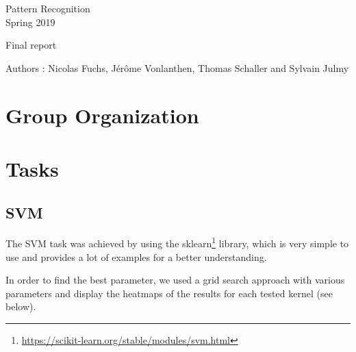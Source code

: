 \documentclass[a4paper,11pt]{report}
\date{\today}
\begin{document}
\begin{center}
  \large{
    Pattern Recognition\\
    Spring 2019
  }
  
  \noindent\makebox[\linewidth]{\rule{\linewidth}{0.4pt}}
  Final report
  \noindent\makebox[\linewidth]{\rule{\linewidth}{0.4pt}}

  \begin{flushleft}
    Authors : Nicolas Fuchs, Jérôme Vonlanthen, Thomas Schaller and Sylvain Julmy
  \end{flushleft}

  

  \noindent\makebox[\linewidth]{\rule{\textwidth}{1pt}}
\end{center}

\section*{Group Organization}

\section*{Tasks}

\subsection*{SVM}

The SVM task was achieved by using the
sklearn\footnote{\url{https://scikit-learn.org/stable/modules/svm.html}}
library, which is very simple to use and provides a lot of examples for a better
understanding.

In order to find the best parameter, we used a grid search approach with various
parameters and display the heatmaps of the results for each tested kernel (see below).
\end{document}
